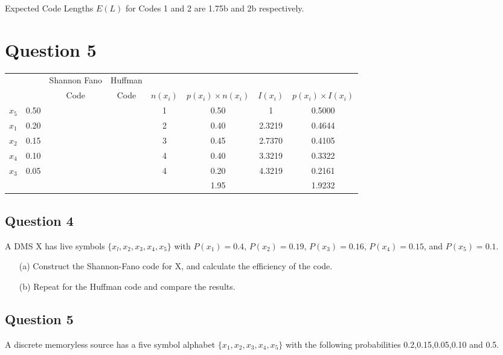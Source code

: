 \documentclass[a4paper,12pt]{article}
\begin{document}
Expected Code Lengths $E(L)$ for Codes 1 and 2 are 1.75b and 2b respectively.

\section*{Question 5}
\begin{center}
\begin{tabular}{|c|c|c|c|c|c|c|c|}
\hline	&		&	Shannon Fano	&	Huffman	&		&		&		&	\\	
	&		&	 Code	&	Code	&	$n(x_i)$	&	$p(x_i) \times n(x_i)$	&	$I(x_i)$	&	$p(x_i) \times I(x_i)$	\\ \hline
$x_5$	&	0.50	&		&		&	1	&	0.50	&	1	&	0.5000	\\ \hline
$x_1$	&	0.20	&		&		&	2	&	0.40	&	2.3219	&	0.4644	\\ \hline
$x_2$	&	0.15	&		&		&	3	&	0.45	&	2.7370	&	0.4105	\\ \hline
$x_4$	&	0.10	&		&		&	4	&	0.40	&	3.3219	&	0.3322	\\ \hline
$x_3$	&	0.05	&		&		&	4	&	0.20	&	4.3219	&	0.2161	\\ \hline
	&		&		&		&		&	1.95	&		&	1.9232	\\ \hline
 
\end{tabular} 
\end{center}

\newpage 
\subsection*{Question 4}
A DMS X has live symbols $\{x_l,x_2,x_3,x_4,x_5\}$ with $P(x_1) = 0.4$, $P(x_2)=0.19$, $P(x_3) =0.16$,
$P(x_4) = 0.15$, and $P(x_5) = 0.1$.
\begin{itemize}
\item[(a)] Construct the Shannon-Fano code for X, and calculate the efficiency of the code.
\item[(b)] Repeat for the Huffman code and compare the results.
\end{itemize}

\subsection*{Question 5}

A discrete memoryless source has a five symbol alphabet $\{x_1,x_2,x_3,x_4,x_5\}$ with the following probabilities 0.2,0.15,0.05,0.10 and 0.5.
\end{document}
